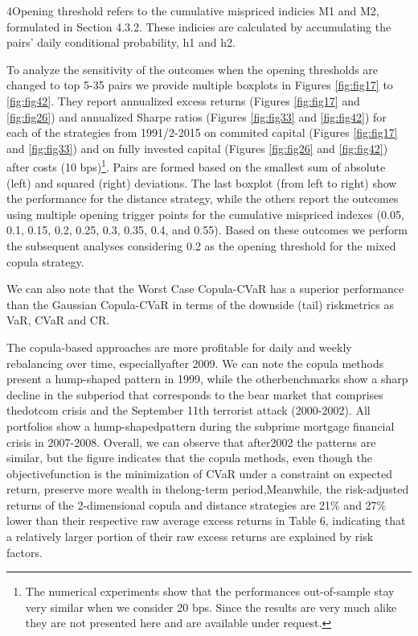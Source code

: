 \documentclass[a4paper]{article}
\begin{document}
4Opening threshold refers to the cumulative mispriced indicies M1 and M2, formulated in Section 4.3.2. These
indicies are calculated by accumulating the pairs’ daily conditional probability, h1 and h2.

To analyze the sensitivity of the outcomes when the opening thresholds are changed to top 5-35 pairs we provide multiple boxplots in Figures \ref{fig:fig17} to \ref{fig:fig42}. They report annualized excess returns (Figures \ref{fig:fig17} and \ref{fig:fig26}) and annualized Sharpe ratios (Figures \ref{fig:fig33} and \ref{fig:fig42}) for each of the strategies from 1991/2-2015 on commited capital (Figures \ref{fig:fig17} and \ref{fig:fig33}) and on fully invested capital (Figures \ref{fig:fig26} and \ref{fig:fig42}) after costs (10 bps)\footnote{The numerical experiments show that the performances out-of-sample stay very similar when we consider 20 bps. Since the results are very much alike they are not presented here and are available under request.}. Pairs are formed based on the smallest sum of absolute (left) and squared (right) deviations. The last boxplot (from left to right) show the performance for the distance strategy, while the others report the outcomes using multiple opening trigger points for the cumulative mispriced indexes (0.05, 0.1, 0.15, 0.2, 0.25, 0.3, 0.35, 0.4, and 0.55). Based on these outcomes we perform the subsequent analyses considering 0.2 as the opening threshold for the mixed copula strategy.

We can also note that the Worst Case Copula-CVaR has a superior performance than the Gaussian Copula-CVaR in terms of the downside (tail) riskmetrics as VaR, CVaR and CR.

The copula-based approaches are more profitable for daily and weekly rebalancing over time, especiallyafter 2009. We can note the copula methods present a hump-shaped pattern in 1999, while the otherbenchmarks show a sharp decline in the subperiod that corresponds to the bear market that comprises thedotcom crisis and the September 11th terrorist attack (2000-2002). All portfolios show a hump-shapedpattern during the subprime mortgage financial crisis in 2007-2008. Overall, we can observe that after2002 the patterns are similar, but the figure indicates that the copula methods, even though the objectivefunction is the minimization of CVaR under a constraint on expected return, preserve more wealth in thelong-term period,Meanwhile, the risk-adjusted returns of
the 2-dimensional copula and distance strategies are 21\% and 27\% lower than their respective
raw average excess returns in Table 6, indicating that a relatively larger portion of their raw
excess returns are explained by risk factors.
\end{document}
